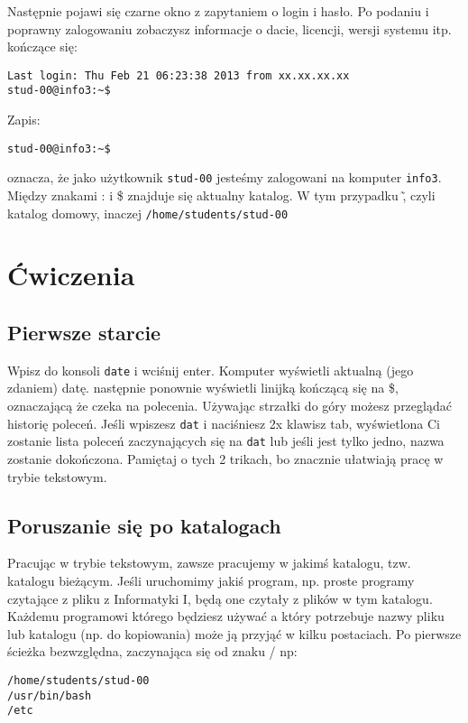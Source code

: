 \documentclass{instrukcja}
\begin{document}
Następnie pojawi się czarne okno z zapytaniem o login i hasło. Po podaniu i poprawny zalogowaniu zobaczysz informacje o dacie, licencji, wersji systemu itp. kończące się:

\begin{verbatim}
Last login: Thu Feb 21 06:23:38 2013 from xx.xx.xx.xx
stud-00@info3:~$
\end{verbatim}

Zapis:
\begin{verbatim}
stud-00@info3:~$
\end{verbatim}
oznacza, że jako użytkownik {\tt stud-00} jesteśmy zalogowani na komputer {\tt info3}. Między znakami : i  \$ znajduje się aktualny katalog. W tym przypadku \~, czyli katalog domowy, inaczej {\tt /home/students/stud-00 }

\section{Ćwiczenia}
\subsection{Pierwsze starcie}

Wpisz do konsoli {\tt date} i wciśnij enter. Komputer wyświetli aktualną (jego zdaniem) datę. następnie ponownie wyświetli linijką kończącą się na \$, oznaczającą że czeka na polecenia. Używając strzałki do góry możesz przeglądać historię poleceń. Jeśli wpiszesz {\tt dat} i naciśniesz 2x klawisz tab, wyświetlona Ci zostanie lista poleceń zaczynających się na {\tt dat} lub jeśli jest tylko jedno, nazwa zostanie dokończona. Pamiętaj o tych 2 trikach, bo znacznie ułatwiają pracę w trybie tekstowym.

\subsection{Poruszanie się po katalogach}

Pracując w trybie tekstowym, zawsze pracujemy w jakimś katalogu, tzw. katalogu bieżącym. Jeśli uruchomimy jakiś program, np. proste programy czytające z pliku z Informatyki I, będą one czytały z plików w tym katalogu. Każdemu programowi którego będziesz używać a który potrzebuje nazwy pliku lub katalogu (np. do kopiowania) może ją przyjąć w kilku postaciach. Po pierwsze ścieżka  bezwzględna, zaczynająca się od znaku / np:
\begin{verbatim}
/home/students/stud-00
/usr/bin/bash
/etc
\end{verbatim}
\end{document}
